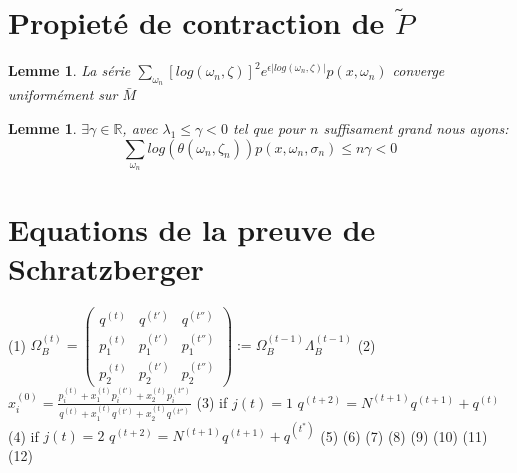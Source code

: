 \documentclass[12pt]{article}
\theoremstyle{plain}%
\newtheorem{lem}[thm]{Lemme}
\theoremstyle{definition}
\theoremstyle{remark}
\begin{document}
\section{Propieté de contraction de $\tilde{P}$}

\begin{lem}
La série $\sum_{\omega_n} [log(\omega_n,\zeta)]^2 e^{\epsilon |log(\omega_n,\zeta)|}p(x,\omega_n)$ converge uniformément sur $\bar{M}$
\end{lem}

\begin{lem}
$\exists \gamma \in \mathbb{R}$, avec $\lambda_1 \leq \gamma < 0$ tel que pour $n$ suffisament grand nous ayons:$$
\sum_{\omega_n} log(\theta(\omega_n,\zeta_n))p(x,\omega_n,\sigma_n) \leq n \gamma <0
$$
\end{lem}

\section{Equations de la preuve de Schratzberger}
(1)
$\Omega_B^{(t)}=\begin{pmatrix}
q^{(t)} & q^{(t')} & q^{(t'')} \\
p_1^{(t)} & p_1^{(t')} & p_1^{(t'')}\\
p_2^{(t)} & p_2^{(t')} & p_2^{(t'')}
\end{pmatrix}
:= \Omega_B^{(t-1)} \Lambda_B^{(t-1)}$
\newline
(2)
$x_i^(0)=\frac{p_i^{(t)}+x_1^{(t)}p_i^{(t')}+x_2^{(t)}p_i^{(t'')}}{q^{(t)}+x_1^{(t)}q^{(t')}+x_2^{(t)}q^{(t'')}}$
\newline
(3)
if $j(t)=1$ $q^{(t+2)}=N^{(t+1)}q^{(t+1)}+q^{(t)}$
\newline
(4)
if $j(t)=2$ $q^{(t+2)}=N^{(t+1)}q^{(t+1)}+q^{(t^*)}$
\newline
(5)
(6)
(7)
(8)
(9)
(10)
(11)
(12)\cite{ref}


\end{document}
